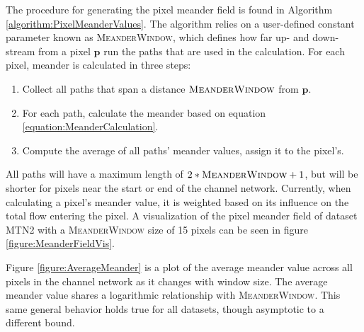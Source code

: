 The procedure for generating the pixel meander field is found in Algorithm \ref{algorithm:PixelMeanderValues}. The algorithm relies on a user-defined constant parameter known as \textsc{MeanderWindow}, which defines how far up- and down-stream from a pixel $\textbf{p}$ run the paths that are used in the calculation. For each pixel, meander is calculated in three steps:

\begin{enumerate}
  \item Collect all paths that span a distance $\textsc{MeanderWindow}$ from $\textbf{p}$.
  \item For each path, calculate the meander based on equation \ref{equation:MeanderCalculation}.
  \item Compute the average of all paths' meander values, assign it to the pixel's.
\end{enumerate}

All paths will have a maximum length of $2 * \textsc{MeanderWindow} + 1$, but will be shorter for pixels near the start or end of the channel network.
Currently, when calculating a pixel's meander value, it is weighted based on its influence on the total flow entering the pixel.
A visualization of the pixel meander field of dataset MTN2 with a \textsc{MeanderWindow} size of 15 pixels can be seen in figure \ref{figure:MeanderFieldVis}.

Figure \ref{figure:AverageMeander} is a plot of the average meander value across all pixels in the channel network as it changes with window size. 
The average meander value shares a logarithmic relationship with \textsc{MeanderWindow}. This same general behavior holds true for all datasets, though asymptotic to a different bound. 


